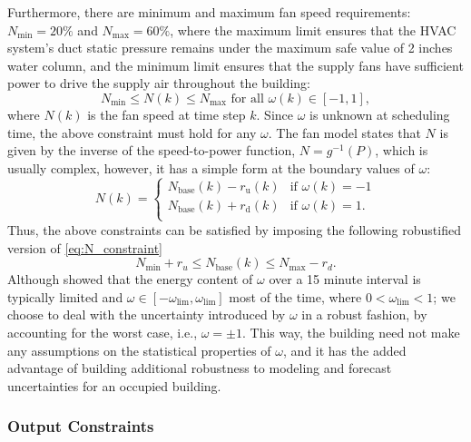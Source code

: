 Furthermore, there are minimum and maximum fan speed requirements: $N_\text{min} = 20\%$ and $N_\text{max} = 60\%$, where the maximum limit ensures that the HVAC system's duct static pressure remains under the maximum safe value of 2 inches water column, and the minimum limit ensures that the supply fans have sufficient power to drive the supply air throughout the building: 
\begin{equation}\label{eq:N_constraint}
N_\text{min} \leq N(k) \leq N_\text{max} \text{~for all~} \omega(k) \in [-1,1],
\end{equation}
where $N(k)$ is the fan speed at time step $k$.
Since $\omega$ is unknown at scheduling time, the above constraint must hold for any $\omega$. 
The fan model states that $N$ is given by the inverse of the speed-to-power function, $N = g^{-1}(P)$, which is usually complex, however, it has a simple form at the boundary values of $\omega$:
\begin{equation}\label{eq:N_w}
N(k) = \begin{cases}
	N_{\text{base}}(k) - r_{\text{u}}(k) & \mbox{if } \omega(k) = -1 \\ 
	N_{\text{base}}(k) + r_{\text{d}}(k) & \mbox{if } \omega(k) = 1. \\ 
	\end{cases} 
\end{equation}
Thus, the above constraints can be satisfied by imposing the following robustified version of \eqref{eq:N_constraint}
\begin{equation}\label{eq:N_constraint_rob}
N_\text{min} + r_u \leq N_{\text{base}}(k) \leq N_\text{max} - r_d.
\end{equation}
Although \cite{Vrettos:2016flexlab1} showed that the energy content of $\omega$ over a 15 minute interval is typically limited and $\omega \in [ -\omega_{\text{lim}}, \omega_{\text{lim}}]$ most of the time, where $0<\omega_{\text{lim}} < 1$;
we choose to deal with the uncertainty introduced by $\omega$ in a robust fashion, by accounting for the worst case, i.e., $\omega = \pm 1$.
This way, the building need not make any assumptions on the statistical properties of $\omega$, and it has the added advantage of building additional robustness to modeling and forecast uncertainties for an occupied building.


\subsubsection{Output Constraints}

